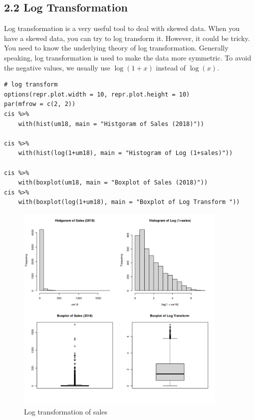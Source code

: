 \documentclass[11pt]{article}
\theoremstyle{definition}
\begin{document}
\subsection{2.2 Log Transformation}

Log transformation is a very useful tool to deal with skewed data.
When you have a skewed data, you can try to log transform it. However, it
could be tricky. You need to know the underlying theory of log transformation.
Generally speaking, log transformation is used to make the data more symmetric.
To avoid the negative values, we usually use \(\log(1+x)\) instead of \(\log(x)\).

\begin{lstlisting}
# log transform
options(repr.plot.width = 10, repr.plot.height = 10)
par(mfrow = c(2, 2))
cis %>%
    with(hist(um18, main = "Histgoram of Sales (2018)"))

cis %>%
    with(hist(log(1+um18), main = "Histogram of Log (1+sales)"))

cis %>%
    with(boxplot(um18, main = "Boxplot of Sales (2018)"))
cis %>%
    with(boxplot(log(1+um18), main = "Boxplot of Log Transform "))
\end{lstlisting}


\begin{figure}
  \centering
  \includegraphics[width=0.9\textwidth]{./figures/vis_figure2.png}
  \caption{Log transformation of sales}
\end{figure}
\end{document}
